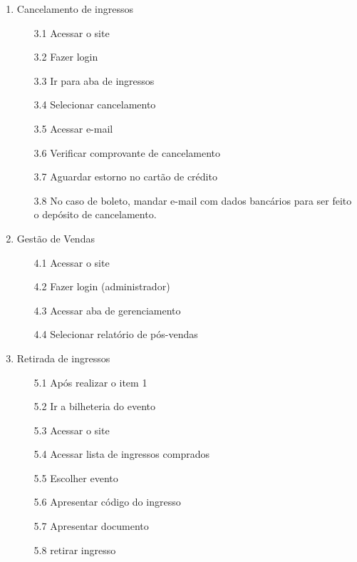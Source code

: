 \documentclass[12pt]{article}
\begin{document}
\begin{enumerate}
                \item Cancelamento de ingressos
                    \begin{enumerate}
                        \item[3.1]Acessar o site
                        \item[3.2]Fazer login
                        \item[3.3]Ir para aba de ingressos
                        \item[3.4]Selecionar cancelamento
                        \item[3.5]Acessar e-mail 
                        \item[3.6]Verificar comprovante de cancelamento
                        \item[3.7]Aguardar estorno no cartão de crédito
                        \item[3.8]No caso de boleto, mandar e-mail com dados bancários para ser feito o depósito de cancelamento.
                \end{enumerate}
           
                \item Gestão de Vendas
                    \begin{enumerate}
                        \item[4.1] Acessar o site
                        \item[4.2] Fazer login (administrador)
                        \item[4.3] Acessar aba de gerenciamento
                        \item[4.4] Selecionar relatório de pós-vendas
                    \end{enumerate}
            
                \item Retirada de ingressos
                    \begin{enumerate}
                        \item[5.1] Após realizar o item 1
                        \item[5.2] Ir a bilheteria do evento
                        \item[5.3] Acessar o site
                        \item[5.4] Acessar lista de ingressos comprados
                        \item[5.5] Escolher evento
                        \item[5.6] Apresentar código do ingresso
                        \item[5.7] Apresentar documento
                        \item[5.8] retirar ingresso
                    \end{enumerate}
            

\end{enumerate}
\end{document}
